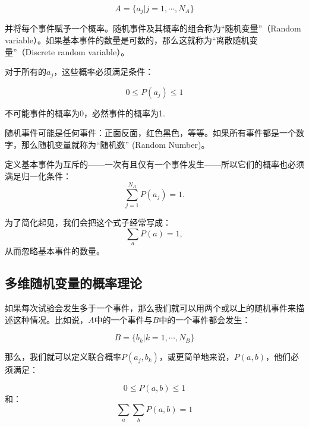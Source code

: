 \documentclass[UTF8]{ctexart}
\numberwithin{equation}{section}%
\numberwithin{figure}{section}%
\begin{document}
    \begin{equation}
        A=\{a_j|j=1,\cdots ,N_A\}
    \end{equation}

    并将每个事件赋予一个概率。随机事件及其概率的组合称为“随机变量”（Random variable）。如果基本事件的数量是可数的，那么这就称为“离散随机变量”（Discrete random variable）。

    对于所有的$a_j$，这些概率必须满足条件：

    \begin{equation}\label{eq3.3}
        0\leq P(a_j) \leq 1
    \end{equation}

    不可能事件的概率为0，必然事件的概率为1.

    随机事件可能是任何事件：正面反面，红色黑色，等等。如果所有事件都是一个数字，那么随机变量就称为“随机数” (Random Number)。

    定义基本事件为互斥的——一次有且仅有一个事件发生——所以它们的概率也必须满足归一化条件：
    \begin{equation}\label{eq3.4}
        \sum ^{N_A}_{j=1}P(a_j)=1.
    \end{equation}

    为了简化起见，我们会把这个式子经常写成：
    \begin{equation}
    \sum_{a}P(a)=1,
    \end{equation}
    从而忽略基本事件的数量。
    
    \subsection{多维随机变量的概率理论}\label{sec3.3}
    如果每次试验会发生多于一个事件，那么我们就可以用两个或以上的随机事件来描述这种情况。比如说，$A$中的一个事件与$B$中的一个事件都会发生：

    \begin{equation}
    B=\{b_k|k=1,\cdots ,N_B\}
    \end{equation}

    那么，我们就可以定义联合概率$P(a_j,b_k)$，或更简单地来说，$P(a,b)$，他们必须满足：

    \begin{equation}
        0\leq P(a,b)\leq 1
    \end{equation}
    和：
    \begin{equation}
        \sum_a\sum_b P(a,b)=1
    \end{equation}
    
\end{document}
